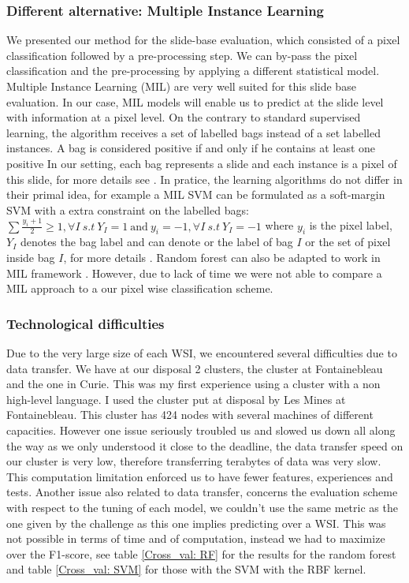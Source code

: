 \documentclass[a4paper,10pt]{article}
\begin{document}
\subsubsection{Different alternative: Multiple Instance Learning}

We presented our method for the slide-base evaluation, which consisted of a pixel classification followed by a pre-processing step. We can by-pass the pixel classification and the pre-processing by applying a different statistical model. Multiple Instance Learning (MIL) are very well suited for this slide base evaluation. 
In our case, MIL models will enable us to predict at the slide level with information at a pixel level. On the contrary to standard supervised learning, the algorithm receives a set of labelled bags instead of a set labelled instances. A bag is considered positive if and only if he contains at least one positive In our setting, each bag represents a slide and each instance is a pixel of this slide, for more details see \citep{maron1998multiple}. In pratice, the learning algorithms do not differ in their primal idea, for example a MIL SVM can be formulated as a soft-margin SVM with a extra constraint on the labelled bags: $\sum \frac{y_i+1}{2} \geqslant 1, \forall I \ s.t \ Y_I=1 \ \text{and} \ y_i=-1, \forall I \ s.t \ Y_I=-1$ where $y_i$ is the pixel label, $Y_I$ denotes the bag label and can denote or the label of bag $I$ or the set of pixel inside bag $I$, for more details \citep{andrews2002support}. Random forest can also be adapted to work in MIL framework \citep{leistner2010miforests}. However, due to lack of time we were not able to compare a MIL approach to a our pixel wise classification scheme.



\subsubsection{Technological difficulties}

Due to the very large size of each WSI, we encountered several difficulties due to data transfer. We have at our disposal 2 clusters, the cluster at Fontainebleau and the one in Curie. This was my first experience using a cluster with a non high-level language. I used the cluster put at disposal by Les Mines at Fontainebleau. This cluster has 424 nodes with several machines of different capacities. However one issue seriously troubled us and slowed us down all along the way as we only understood it close to the deadline, the data transfer speed on our cluster is very low, therefore transferring terabytes of data was very slow. This computation limitation enforced us to have fewer features, experiences and tests. Another issue also related to data transfer, concerns the evaluation scheme with respect to the tuning of each model, we couldn't use the same metric as the one given by the challenge as this one implies predicting over a WSI. This was not possible in terms of time and of computation, instead we had to maximize over the F1-score, see table \ref{Cross_val: RF} for the results for the random forest and table \ref{Cross_val: SVM} for those with the SVM with the RBF kernel.
\end{document}
